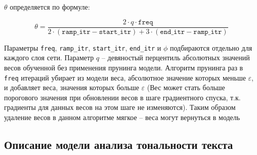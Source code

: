 \documentclass[12pt]{article}
\begin{document}
\newpage
$\theta$ определяется по формуле:

\begin{equation}
  \theta = \frac{2 \cdot q \cdot \mathtt{freq}}{2 \cdot (\mathtt{ramp\_itr} - \mathtt{start\_itr}) + 3 \cdot (\mathtt{end\_itr} - \mathtt{ramp\_itr})}
\end{equation}


Параметры \texttt{freq}, \texttt{ramp\_itr}, \texttt{start\_itr}, \texttt{end\_itr} и $\phi$ подбираются отдельно для каждого слоя сети. Параметр $q$ -- девяностый
перцентиль абсолютных значений весов обученной без применения прунинга модели. Алгоритм прунинга раз в \texttt{freq} итераций убирает из модели
веса, абсолютное значение которых меньше $\varepsilon$, и добавляет веса, значения которых больше $\varepsilon$ (Вес может стать больше порогового значения при 
обновлении весов в шаге градиентного спуска, т.к. градиенты для данных весов на этом шаге не изменяются). Таким образом удаление весов в данном алгоритме мягкое -- веса могут
вернуться в модель

\subsection*{Описание модели анализа тональности текста}
%
\end{document}
